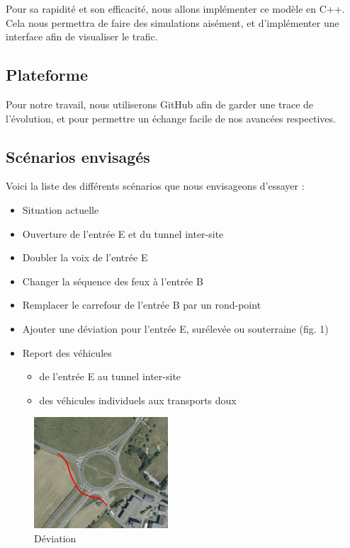 \documentclass[a4paper,10pt]{extarticle}
\begin{document}
Pour sa rapidité et son efficacité, nous allons implémenter ce modèle en C++. Cela nous permettra de faire des simulations aisément, et d'implémenter une interface afin de visualiser le trafic.

\subsection*{Plateforme}

Pour notre travail, nous utiliserons GitHub afin de garder une trace de l'évolution, et pour permettre un échange facile de nos avancées respectives.

\subsection*{Scénarios envisagés}

Voici la liste des différents scénarios que nous envisageons d'essayer :

\begin{itemize}
\item Situation actuelle
\item Ouverture de l'entrée E et du tunnel inter-site
\item Doubler la voix de l'entrée E
\item Changer la séquence des feux à l'entrée B
\item Remplacer le carrefour de l'entrée B par un rond-point
\item Ajouter une déviation pour l'entrée E, surélevée ou souterraine (fig. 1)
\item Report des véhicules
\begin{itemize}
\item de l'entrée E au tunnel inter-site
\item des véhicules individuels aux transports doux
\end{itemize}
\end{itemize}

\begin{figure}[h!]
\begin{center}
\includegraphics[width=5cm]{plan_E_scenario.png}
\caption{Déviation}
\end{center}
\end{figure}
\end{document}
